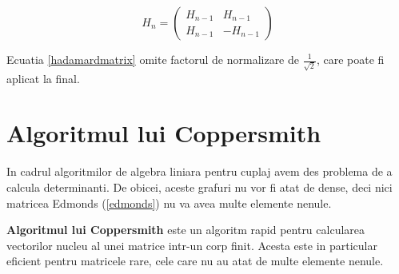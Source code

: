 \begin{equation}
  \label{hadamardmatrix}
  H_{n} =
  \begin{pmatrix}
    H_{n-1} & H_{n-1}\\
    H_{n-1} & -H_{n-1}
  \end{pmatrix}
\end{equation}

Ecuatia \ref{hadamardmatrix} omite factorul de normalizare de
$\frac{1}{\sqrt{2}}$, care poate fi aplicat la final.

\begin{algorithm}[H]
  \DontPrintSemicolon
  \;
\end{algorithm}

\begin{algorithm}[H]
  \DontPrintSemicolon
  \;
\end{algorithm}

\pagebreak

\section{Algoritmul lui Coppersmith}
\label{coppersmith}

In cadrul algoritmilor de algebra liniara pentru cuplaj avem des problema de a
calcula determinanti. De obicei, aceste grafuri nu vor fi atat de dense, deci
nici matricea Edmonds (\ref{edmonds}) nu va avea multe elemente nenule.

\textbf{Algoritmul lui Coppersmith} \cite{wiedemann} este un algoritm rapid pentru calcularea
vectorilor nucleu al unei matrice intr-un corp finit. Acesta este in particular
eficient pentru matricele rare, cele care nu au atat de multe elemente nenule. \\

